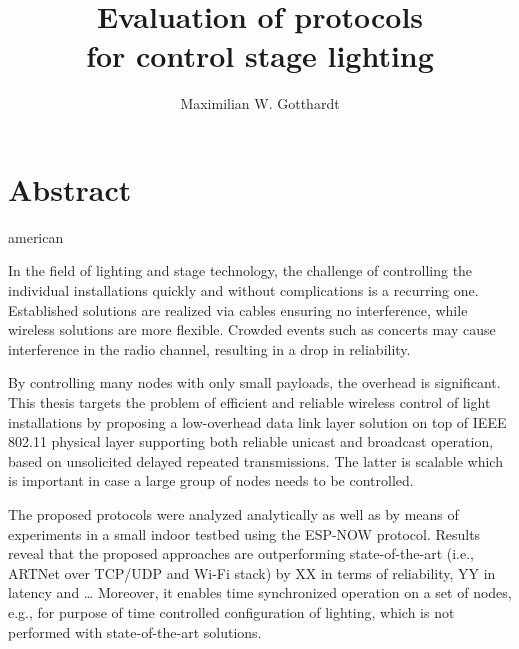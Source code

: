 \documentclass[]{ccs-thesis}
\author{Maximilian W. Gotthardt}
\title{Evaluation of protocols \\for control stage lighting}
\begin{document}

\maketitle

\thispagestyle{empty}

\cleardoublepage

\chapter*{Abstract}
\begin{otherlanguage*}{american}


In the field of lighting and stage technology, the challenge of controlling the individual installations 
quickly and without complications is a recurring one.
Established solutions are realized via cables ensuring no interference,
while wireless solutions are more flexible.
Crowded events such as concerts may cause interference in the radio channel, 
resulting in a drop in reliability.

By controlling many nodes with only small payloads, the overhead is significant.
This thesis targets the problem of efficient and reliable wireless control of light installations 
by proposing a low-overhead data link layer solution on top of IEEE 802.11 physical layer
supporting both reliable unicast and broadcast operation,
based on unsolicited delayed repeated transmissions.
The latter is scalable which is important in case a large group of nodes needs to be controlled.

The proposed protocols were analyzed analytically 
as well as by means of experiments in a small indoor testbed using the ESP-NOW protocol. 
Results reveal that the proposed approaches are outperforming state-of-the-art 
(i.e., ARTNet over TCP/UDP and Wi-Fi stack) by XX in terms of reliability, YY in latency and … 
Moreover, it enables time synchronized operation on a set of nodes, e.g., 
for purpose of time controlled configuration of lighting, 
which is not performed with state-of-the-art solutions.


\end{otherlanguage*}
\end{document}
